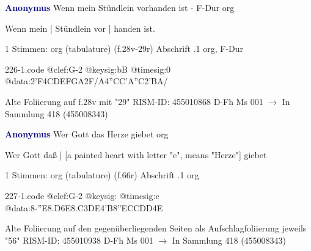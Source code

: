 \documentclass[twocolumn]{book}
\begin{document}
\newline \par \vspace{7pt} \textcolor{darkblue}{\textbf{Anonymus  }}
\newline Wenn mein Stündlein vorhanden ist - F-Dur
\newline org
\newline \begin{itshape}[f.28v, at left:] Wenn mein | Stündlein vor | handen ist.\end{itshape} 
\newline \textcolor{darkblue}{}  1 Stimmen: org (tabulature)  (f.28v-29r)
\newline Abschrift
.1  org, F-Dur  
\begin{filecontents*}{226-1.code}
@clef:G-2
@keysig:bB
@timesig:0
@data:2'F4CDEFGA2F/A4''CC'A''C2'BA/
\end{filecontents*}
\newline
%
\newline Alte Foliierung auf f.28v mit "29"
\newline RISM-ID: 455010868
\newline D-Fh  Ms 001
\newline $\rightarrow$ In Sammlung 418 (455008343)
      
\newline \par \vspace{7pt} \textcolor{darkblue}{\textbf{Anonymus  }}
\newline Wer Gott das Herze giebet
\newline org
\newline \begin{itshape}[f.66r, at left:] Wer Gott daß | [a painted heart with letter "e", means "Herze"] giebet\end{itshape} 
\newline \textcolor{darkblue}{}  1 Stimmen: org (tabulature)  (f.66r)
\newline Abschrift
.1  org  
\begin{filecontents*}{227-1.code}
@clef:G-2
@keysig:
@timesig:c
@data:8-{''E8.D6E}{8.C3DE}4'B{8''ECC}{DD}4E
\end{filecontents*}
\newline
%
\newline Alte Foliierung auf den gegenüberliegenden Seiten als Aufschlagfoliierung jeweils "56"
\newline RISM-ID: 455010938
\newline D-Fh  Ms 001
\newline $\rightarrow$ In Sammlung 418 (455008343)
      
\end{document}
